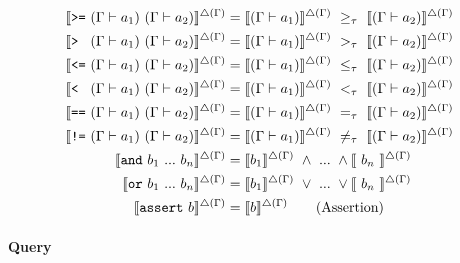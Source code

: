 
\begin{align}
    \llbracket \text{\texttt{>=}}~(\Gamma\vdash{a_1})~(\Gamma\vdash{a_2}) \rrbracket^{\triangle(\Gamma)} &= \llbracket (\Gamma\vdash{a_1}) \rrbracket^{\triangle(\Gamma)}~\geq_\tau~\llbracket (\Gamma\vdash{a_2}) \rrbracket^{\triangle(\Gamma)}\\
    \llbracket \text{\texttt{> }}~(\Gamma\vdash{a_1})~(\Gamma\vdash{a_2}) \rrbracket^{\triangle(\Gamma)} &= \llbracket (\Gamma\vdash{a_1}) \rrbracket^{\triangle(\Gamma)}~>_\tau~\llbracket (\Gamma\vdash{a_2}) \rrbracket^{\triangle(\Gamma)}\\
    \llbracket \text{\texttt{<=}}~(\Gamma\vdash{a_1})~(\Gamma\vdash{a_2}) \rrbracket^{\triangle(\Gamma)} &= \llbracket (\Gamma\vdash{a_1}) \rrbracket^{\triangle(\Gamma)}~\leq_\tau~\llbracket (\Gamma\vdash{a_2}) \rrbracket^{\triangle(\Gamma)}\\
    \llbracket \text{\texttt{< }}~(\Gamma\vdash{a_1})~(\Gamma\vdash{a_2}) \rrbracket^{\triangle(\Gamma)} &= \llbracket (\Gamma\vdash{a_1}) \rrbracket^{\triangle(\Gamma)}~<_\tau~\llbracket (\Gamma\vdash{a_2}) \rrbracket^{\triangle(\Gamma)}\\
    \llbracket \text{\texttt{==}}~(\Gamma\vdash{a_1})~(\Gamma\vdash{a_2}) \rrbracket^{\triangle(\Gamma)} &= \llbracket (\Gamma\vdash{a_1}) \rrbracket^{\triangle(\Gamma)}~=_\tau~\llbracket (\Gamma\vdash{a_2}) \rrbracket^{\triangle(\Gamma)}\\
    \llbracket \text{\texttt{!=}}~(\Gamma\vdash{a_1})~(\Gamma\vdash{a_2}) \rrbracket^{\triangle(\Gamma)} &= \llbracket (\Gamma\vdash{a_1}) \rrbracket^{\triangle(\Gamma)}~\neq_\tau~\llbracket (\Gamma\vdash{a_2}) \rrbracket^{\triangle(\Gamma)} \\
    \llbracket \text{\texttt{and}}~b_1~...~b_n\rrbracket^{\triangle(\Gamma)} &= \llbracket b_1 \rrbracket^{\triangle(\Gamma)}~\land~...~\land\llbracket~b_n~\rrbracket^{\triangle(\Gamma)}\\
    \llbracket \text{\texttt{or}}~b_1~...~b_n\rrbracket^{\triangle(\Gamma)} &= \llbracket b_1 \rrbracket^{\triangle(\Gamma)}~\lor~...~\lor\llbracket~b_n~\rrbracket^{\triangle(\Gamma)}\\
    \llbracket \text{\texttt{assert}}~b\rrbracket^{\triangle(\Gamma)} &= \llbracket b \rrbracket^{\triangle(\Gamma)} \tag{Assertion}
\end{align}

\paragraph{Query}
